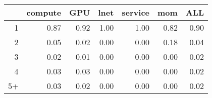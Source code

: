 \documentclass{article}
\begin{document}
\begin{table}[ht]
\centering
\begin{tabular}{rrrrrrr}
  \hline
 & compute & GPU & lnet & service & mom & ALL \\ 
  \hline
1 & 0.87 & 0.92 & 1.00 & 1.00 & 0.82 & 0.90 \\ 
  2 & 0.05 & 0.02 & 0.00 & 0.00 & 0.18 & 0.04 \\ 
  3 & 0.02 & 0.01 & 0.00 & 0.00 & 0.00 & 0.02 \\ 
  4 & 0.03 & 0.03 & 0.00 & 0.00 & 0.00 & 0.02 \\ 
  5+ & 0.03 & 0.02 & 0.00 & 0.00 & 0.00 & 0.02 \\ 
   \hline
\end{tabular}
\end{table}
\thispagestyle{empty}
\end{document}
